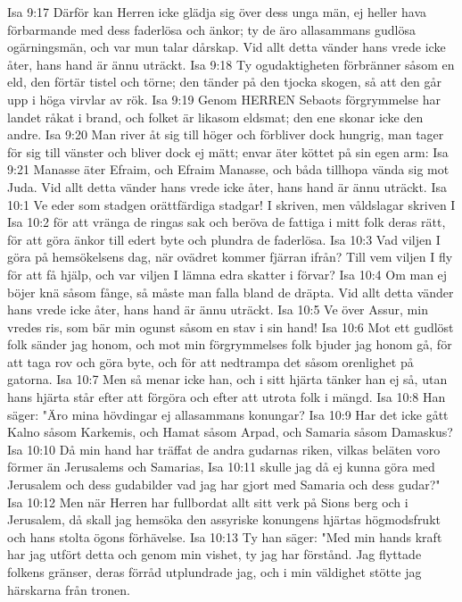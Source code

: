 Isa 9:17  Därför kan Herren icke glädja sig över dess unga män, ej heller hava förbarmande med dess faderlösa och änkor; ty de äro allasammans gudlösa ogärningsmän, och var mun talar dårskap. Vid allt detta vänder hans vrede icke åter, hans hand är ännu uträckt.
Isa 9:18  Ty ogudaktigheten förbränner såsom en eld, den förtär tistel och törne; den tänder på den tjocka skogen, så att den går upp i höga virvlar av rök.
Isa 9:19  Genom HERREN Sebaots förgrymmelse har landet råkat i brand, och folket är likasom eldsmat; den ene skonar icke den andre.
Isa 9:20  Man river åt sig till höger och förbliver dock hungrig, man tager för sig till vänster och bliver dock ej mätt; envar äter köttet på sin egen arm:
Isa 9:21  Manasse äter Efraim, och Efraim Manasse, och båda tillhopa vända sig mot Juda. Vid allt detta vänder hans vrede icke åter, hans hand är ännu uträckt.
Isa 10:1  Ve eder som stadgen orättfärdiga stadgar! I skriven, men våldslagar skriven I
Isa 10:2  för att vränga de ringas sak och beröva de fattiga i mitt folk deras rätt, för att göra änkor till edert byte och plundra de faderlösa.
Isa 10:3  Vad viljen I göra på hemsökelsens dag, när ovädret kommer fjärran ifrån? Till vem viljen I fly för att få hjälp, och var viljen I lämna edra skatter i förvar?
Isa 10:4  Om man ej böjer knä såsom fånge, så måste man falla bland de dräpta. Vid allt detta vänder hans vrede icke åter, hans hand är ännu uträckt.
Isa 10:5  Ve över Assur, min vredes ris, som bär min ogunst såsom en stav i sin hand!
Isa 10:6  Mot ett gudlöst folk sänder jag honom, och mot min förgrymmelses folk bjuder jag honom gå, för att taga rov och göra byte, och för att nedtrampa det såsom orenlighet på gatorna.
Isa 10:7  Men så menar icke han, och i sitt hjärta tänker han ej så, utan hans hjärta står efter att förgöra och efter att utrota folk i mängd.
Isa 10:8  Han säger: "Äro mina hövdingar ej allasammans konungar?
Isa 10:9  Har det icke gått Kalno såsom Karkemis, och Hamat såsom Arpad, och Samaria såsom Damaskus?
Isa 10:10  Då min hand har träffat de andra gudarnas riken, vilkas beläten voro förmer än Jerusalems och Samarias,
Isa 10:11  skulle jag då ej kunna göra med Jerusalem och dess gudabilder vad jag har gjort med Samaria och dess gudar?"
Isa 10:12  Men när Herren har fullbordat allt sitt verk på Sions berg och i Jerusalem, då skall jag hemsöka den assyriske konungens hjärtas högmodsfrukt och hans stolta ögons förhävelse.
Isa 10:13  Ty han säger: "Med min hands kraft har jag utfört detta och genom min vishet, ty jag har förstånd. Jag flyttade folkens gränser, deras förråd utplundrade jag, och i min väldighet stötte jag härskarna från tronen.

